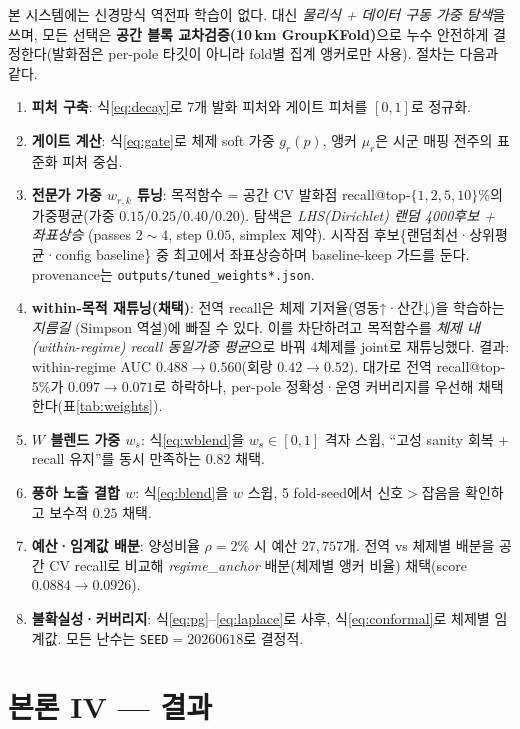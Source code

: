 \documentclass[11pt,a4paper]{article}
\begin{document}
본 시스템에는 신경망식 역전파 학습이 없다. 대신 \emph{물리식 + 데이터 구동 가중 탐색}을 쓰며, 모든
선택은 \textbf{공간 블록 교차검증(10\,km GroupKFold)}으로 누수 안전하게 결정한다(발화점은 per-pole
타깃이 아니라 fold별 집계 앵커로만 사용). 절차는 다음과 같다.

\begin{enumerate}[leftmargin=1.5em,itemsep=2pt]
\item \textbf{피처 구축}: 식\eqref{eq:decay}로 7개 발화 피처와 게이트 피처를 $[0,1]$로 정규화.
\item \textbf{게이트 계산}: 식\eqref{eq:gate}로 체제 soft 가중 $g_r(p)$, 앵커 $\mu_r$은 시군 매핑 전주의
표준화 피처 중심.
\item \textbf{전문가 가중 $w_{r,k}$ 튜닝}: 목적함수 = 공간 CV 발화점 recall@top-$\{1,2,5,10\}\%$의
가중평균(가중 $0.15/0.25/0.40/0.20$). 탐색은 \emph{LHS(Dirichlet) 랜덤 4000후보 + 좌표상승}
(passes $2{\sim}4$, step $0.05$, simplex 제약). 시작점 후보\{랜덤최선·상위평균·config baseline\} 중
최고에서 좌표상승하며 baseline-keep 가드를 둔다. provenance는 \texttt{outputs/tuned\_weights*.json}.
\item \textbf{within-목적 재튜닝(채택)}: 전역 recall은 체제 기저율(영동↑·산간↓)을 학습하는 \emph{지름길}
(Simpson 역설)에 빠질 수 있다. 이를 차단하려고 목적함수를 \emph{체제 내(within-regime) recall 동일가중
평균}으로 바꿔 4체제를 joint로 재튜닝했다. 결과: within-regime AUC $0.488\!\to\!0.560$(회랑
$0.42\!\to\!0.52$). 대가로 전역 recall@top-5\%가 $0.097\!\to\!0.071$로 하락하나, per-pole 정확성·운영
커버리지를 우선해 채택한다(표\ref{tab:weights}).
\item \textbf{$W$ 블렌드 가중 $w_s$}: 식\eqref{eq:wblend}을 $w_s\in[0,1]$ 격자 스윕, ``고성 sanity
회복 + recall 유지''를 동시 만족하는 $0.82$ 채택.
\item \textbf{풍하 노출 결합 $w$}: 식\eqref{eq:blend}을 $w$ 스윕, 5 fold-seed에서 신호$>$잡음을 확인하고
보수적 $0.25$ 채택.
\item \textbf{예산·임계값 배분}: 양성비율 $\rho=2\%$ 시 예산 $27{,}757$개. 전역 vs 체제별 배분을 공간 CV
recall로 비교해 \emph{regime\_anchor} 배분(체제별 앵커 비율) 채택(score $0.0884\!\to\!0.0926$).
\item \textbf{불확실성·커버리지}: 식\eqref{eq:pg}--\eqref{eq:laplace}로 사후, 식\eqref{eq:conformal}로
체제별 임계값. 모든 난수는 \texttt{SEED}$=20260618$로 결정적.
\end{enumerate}

\section{본론 IV — 결과}
\end{document}

